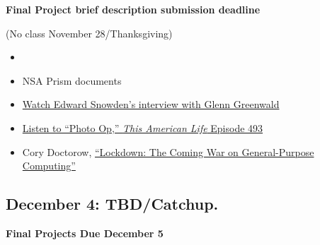 \textbf{Final Project brief description submission deadline}

(No class November 28/Thanksgiving)

\begin{itemize}
\item
  \cite[Networked Authoritarianism]{mackinnon_consent_2012}
\item
  NSA Prism documents
\item
  \href{http://www.youtube.com/watch?v=5yB3n9fu-rM}{Watch Edward
  Snowden's interview with Glenn Greenwald}
\item
  \href{http://www.thisamericanlife.org/radio-archives/episode/493/picture-show?act=1}{Listen
  to ``Photo Op,'' \emph{This American Life} Episode 493}
\item
  Cory Doctorow,
  \href{http://boingboing.net/2012/01/10/lockdown.html}{``Lockdown: The
  Coming War on General-Purpose Computing''}
\end{itemize}

\subsection{December 4: TBD/Catchup.}

\textbf{Final Projects Due December 5}
